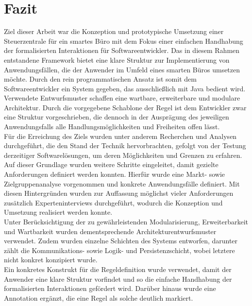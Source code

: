 \chapter{Fazit}
\label{chap:fazit}
    Ziel dieser Arbeit war die Konzeption und prototypische Umsetzung einer Steuerzentrale für ein 
    smartes Büro mit dem Fokus einer einfachen Handhabung der formalisierten Interaktionen für Softwareentwickler. 
    Das in diesem Rahmen entstandene Framework bietet eine klare Struktur zur Implementierung von Anwendungsfällen, die der Anwender 
    im Umfeld eines smarten Büros umsetzen möchte. Durch den rein programmatischen Ansatz ist somit 
    dem Softwareentwickler ein System gegeben, das ausschließlich mit Java bedient wird. Verwendete 
    Entwurfsmuster schaffen eine wartbare, erweiterbare und modulare Architektur. Durch die vorgegebene Schablone der 
    Regel ist dem Entwickler zwar eine Struktur vorgeschrieben, die dennoch in der 
    Ausprägung des jeweiligen Anwendungsfalls alle Handlungsmöglichkeiten und Freiheiten offen lässt. 
    \\
    \linebreak 
    Für die Erreichung des Ziels wurden unter anderem Recherchen und Analysen durchgeführt, die den Stand 
    der Technik hervorbrachten, gefolgt von der Testung derzeitiger Softwarelösungen, um deren Möglichkeiten und Grenzen zu erfahren. 
    Auf dieser Grundlage wurden weitere Schritte eingeleitet, damit gezielte Anforderungen definiert werden konnten. Hierfür wurde 
    eine Markt- sowie Zielgruppenanalyse vorgenommen und konkrete Anwendungsfälle definiert. Mit diesen Hintergründen wurden zur 
    Auffassung möglichst vieler Anforderungen zusätzlich Experteninterviews durchgeführt, wodurch die Konzeption und Umsetzung 
    realisiert werden konnte. 
    \\
    \linebreak
    Unter Berücksichtigung der zu gewährleistenden Modularisierung, Erweiterbarkeit und Wartbarkeit wurden dementsprechende 
    Architekturentwurfsmuster verwendet. Zudem wurden einzelne Schichten des Systems entworfen, darunter zählt die Kommunikations- sowie 
    Logik- und Persistenzschicht, wobei letztere nicht konkret konzipiert wurde.     
    \\
    Ein konkretes Konstrukt für die Regeldefinition wurde verwendet, damit der Anwender eine klare Struktur vorfindet und so die 
    einfache Handhabung der formalisierten Interaktionen gefördert wird. Darüber hinaus wurde eine Annotation ergänzt, die eine Regel als solche 
    deutlich markiert.
